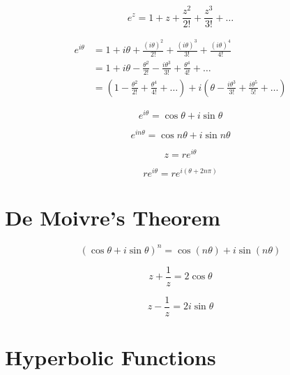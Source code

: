 \begin{equation*}
    e^z = 1 + z + \frac{z^2}{2!} + \frac{z^3}{3!} + \dots
\end{equation*}

\begin{align*}
    e^{i\theta} &= 1 + i\theta + \frac{(i\theta)^{2}}{2!} + \frac{(i\theta)^{3}}{3!} + \frac{(i\theta)^{4}}{4!}\\
    &= 1 + i\theta - \frac{\theta^{2}}{2!} - \frac{i\theta^{3}}{3!} + \frac{\theta^{4}}{4!} + \dots\\
    &= \left(1 - \frac{\theta^{2}}{2!} + \frac{\theta^{4}}{4!} + \dots\right) + i\left(\theta - \frac{i\theta^{3}}{3!} + \frac{i\theta^{5}}{5!} + \dots\right)
\end{align*}

\begin{equation*}
    e^{i\theta} = \cos\theta + i\sin\theta
\end{equation*}

\begin{equation*}
    e^{in\theta} = \cos n\theta + i \sin n\theta
\end{equation*}

\begin{equation*}
    z = re^{i\theta}
\end{equation*}

\begin{equation*}
    re^{i\theta} = re^{i(\theta + 2n\pi)}
\end{equation*}

\section{De Moivre's Theorem}
\begin{equation*}
    (\cos\theta + i\sin\theta)^n = \cos(n\theta) + i\sin(n\theta)
\end{equation*}

\begin{equation*}
    z + \frac{1}{z} = 2\cos\theta
\end{equation*}

\begin{equation*}
    z - \frac{1}{z} = 2i\sin\theta
\end{equation*}

\section{Hyperbolic Functions}

